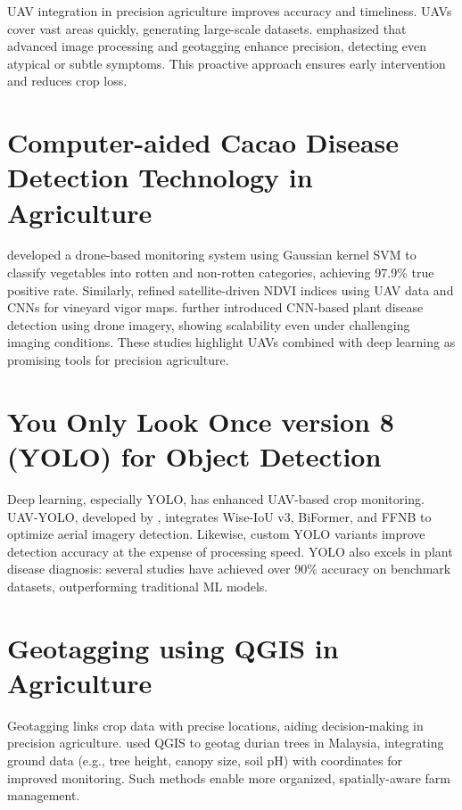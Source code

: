 UAV integration in precision agriculture improves accuracy and timeliness. UAVs cover vast areas quickly, generating large-scale datasets. \cite{Taesiri2023} emphasized that advanced image processing and geotagging enhance precision, detecting even atypical or subtle symptoms. This proactive approach ensures early intervention and reduces crop loss.

\section{Computer-aided Cacao Disease Detection Technology in Agriculture}
\cite{Alam2022} developed a drone-based monitoring system using Gaussian kernel SVM to classify vegetables into rotten and non-rotten categories, achieving 97.9\% true positive rate. Similarly, \cite{Mazzia2020} refined satellite-driven NDVI indices using UAV data and CNNs for vineyard vigor maps. \cite{Vardhan2023} further introduced CNN-based plant disease detection using drone imagery, showing scalability even under challenging imaging conditions. These studies highlight UAVs combined with deep learning as promising tools for precision agriculture.

\section{You Only Look Once version 8 (YOLO) for Object Detection}
Deep learning, especially YOLO, has enhanced UAV-based crop monitoring. UAV-YOLO, developed by \cite{Wang2023}, integrates Wise-IoU v3, BiFormer, and FFNB to optimize aerial imagery detection. Likewise, custom YOLO variants improve detection accuracy at the expense of processing speed. YOLO also excels in plant disease diagnosis: several studies have achieved over 90\% accuracy on benchmark datasets, outperforming traditional ML models.

\section{Geotagging using QGIS in Agriculture}
Geotagging links crop data with precise locations, aiding decision-making in precision agriculture. \cite{Rahman2021} used QGIS to geotag durian trees in Malaysia, integrating ground data (e.g., tree height, canopy size, soil pH) with coordinates for improved monitoring. Such methods enable more organized, spatially-aware farm management.

